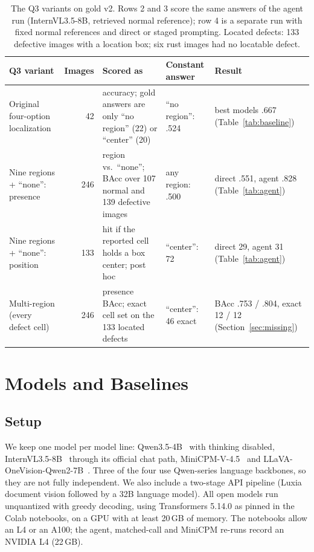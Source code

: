 \documentclass[11pt]{article}
\begin{document}
\begin{table}[t]
\centering
\caption{The Q3 variants on gold v2. Rows 2 and 3 score the same answers of the agent run (InternVL3.5-8B, retrieved normal reference); row 4 is a separate run with fixed normal references and direct or staged prompting. Located defects: 133 defective images with a location box; six rust images had no locatable defect.}
\label{tab:q3sets}
\small
\begin{tabular}{p{2.9cm}rp{4.1cm}p{2.3cm}p{3.4cm}}
\toprule
Q3 variant & Images & Scored as & Constant answer & Result \\
\midrule
Original four-option localization & 42 & accuracy; gold answers are only ``no region'' (22) or ``center'' (20) & ``no region'': .524 & best models .667 (Table~\ref{tab:baseline}) \\
Nine regions + ``none'': presence & 246 & region vs.\ ``none''; BAcc over 107 normal and 139 defective images & any region: .500 & direct .551, agent .828 (Table~\ref{tab:agent}) \\
Nine regions + ``none'': position & 133 & hit if the reported cell holds a box center; post hoc & ``center'': 72 & direct 29, agent 31 (Table~\ref{tab:agent}) \\
Multi-region (every defect cell) & 246 & presence BAcc; exact cell set on the 133 located defects & ``center'': 46 exact & BAcc .753 / .804, exact 12 / 12 (Section~\ref{sec:missing}) \\
\bottomrule
\end{tabular}
\end{table}

\section{Models and Baselines}\label{sec:baselines}
\subsection{Setup}
We keep one model per model line: Qwen3.5-4B~\cite{qwen35} with thinking disabled, InternVL3.5-8B~\cite{wang2025internvl35} through its official chat path, MiniCPM-V-4.5~\cite{yao2024minicpmv} and LLaVA-OneVision-Qwen2-7B~\cite{li2024llavaov}. Three of the four use Qwen-series language backbones, so they are not fully independent. We also include a two-stage API pipeline (Luxia document vision followed by a 32B language model). All open models run unquantized with greedy decoding, using Transformers 5.14.0 as pinned in the Colab notebooks, on a GPU with at least 20\,GB of memory. The notebooks allow an L4 or an A100; the agent, matched-call and MiniCPM re-runs record an NVIDIA L4 (22\,GB).
\end{document}
